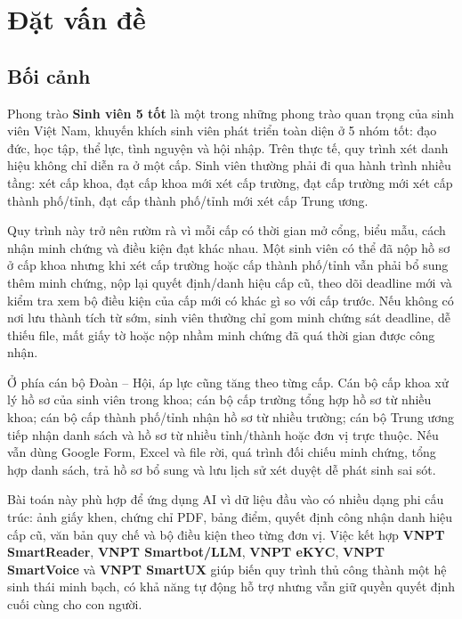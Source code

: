 \section{Đặt vấn đề}

\subsection{Bối cảnh}

Phong trào \textbf{Sinh viên 5 tốt} là một trong những phong trào quan trọng của sinh viên Việt Nam, khuyến khích sinh viên phát triển toàn diện ở 5 nhóm tốt: đạo đức, học tập, thể lực, tình nguyện và hội nhập. Trên thực tế, quy trình xét danh hiệu không chỉ diễn ra ở một cấp. Sinh viên thường phải đi qua hành trình nhiều tầng: xét cấp khoa, đạt cấp khoa mới xét cấp trường, đạt cấp trường mới xét cấp thành phố/tỉnh, đạt cấp thành phố/tỉnh mới xét cấp Trung ương.

\noindent Quy trình này trở nên rườm rà vì mỗi cấp có thời gian mở cổng, biểu mẫu, cách nhận minh chứng và điều kiện đạt khác nhau. Một sinh viên có thể đã nộp hồ sơ ở cấp khoa nhưng khi xét cấp trường hoặc cấp thành phố/tỉnh vẫn phải bổ sung thêm minh chứng, nộp lại quyết định/danh hiệu cấp cũ, theo dõi deadline mới và kiểm tra xem bộ điều kiện của cấp mới có khác gì so với cấp trước. Nếu không có nơi lưu thành tích từ sớm, sinh viên thường chỉ gom minh chứng sát deadline, dễ thiếu file, mất giấy tờ hoặc nộp nhầm minh chứng đã quá thời gian được công nhận.

\noindent Ở phía cán bộ Đoàn -- Hội, áp lực cũng tăng theo từng cấp. Cán bộ cấp khoa xử lý hồ sơ của sinh viên trong khoa; cán bộ cấp trường tổng hợp hồ sơ từ nhiều khoa; cán bộ cấp thành phố/tỉnh nhận hồ sơ từ nhiều trường; cán bộ Trung ương tiếp nhận danh sách và hồ sơ từ nhiều tỉnh/thành hoặc đơn vị trực thuộc. Nếu vẫn dùng Google Form, Excel và file rời, quá trình đối chiếu minh chứng, tổng hợp danh sách, trả hồ sơ bổ sung và lưu lịch sử xét duyệt dễ phát sinh sai sót.

\noindent Bài toán này phù hợp để ứng dụng AI vì dữ liệu đầu vào có nhiều dạng phi cấu trúc: ảnh giấy khen, chứng chỉ PDF, bảng điểm, quyết định công nhận danh hiệu cấp cũ, văn bản quy chế và bộ điều kiện theo từng đơn vị. Việc kết hợp \textbf{VNPT SmartReader}, \textbf{VNPT Smartbot/LLM}, \textbf{VNPT eKYC}, \textbf{VNPT SmartVoice} và \textbf{VNPT SmartUX} giúp biến quy trình thủ công thành một hệ sinh thái minh bạch, có khả năng tự động hỗ trợ nhưng vẫn giữ quyền quyết định cuối cùng cho con người.

